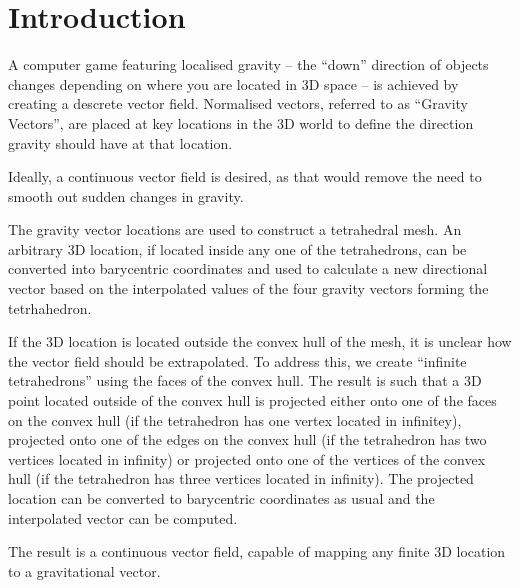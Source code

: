 \section{Introduction}

A computer game featuring localised gravity -- the ``down'' direction of objects
changes  depending on where you are located  in  3D  space  --  is  achieved  by
creating a descrete  vector  field. Normalised vectors, referred to as ``Gravity
Vectors'', are placed at key locations  in  the 3D world to define the direction
gravity should have at that location.

Ideally, a continuous vector field is desired,  as that would remove the need to
smooth out  sudden  changes in gravity.

The  gravity  vector locations are used to  construct  a  tetrahedral  mesh.  An
arbitrary 3D location, if located inside any  one  of  the  tetrahedrons, can be
converted into barycentric coordinates and used  to  calculate a new directional
vector based on the interpolated values of the four  gravity vectors forming the
tetrhahedron.

If the 3D location is located outside the convex hull of the mesh, it is unclear
how  the  vector  field should be  extrapolated.  To  address  this,  we  create
``infinite tetrahedrons'' using the faces of the convex hull. The result is such
that a 3D  point located outside of the convex hull is projected either onto one
of the faces on the convex  hull  (if  the tetrahedron has one vertex located in
infinitey),  projected  onto  one of the  edges  on  the  convex  hull  (if  the
tetrahedron has two vertices  located  in infinity) or projected onto one of the
vertices  of  the  convex hull (if the tetrahedron has three vertices located in
infinity). The projected location can be converted to barycentric coordinates as
usual and the interpolated vector can be computed.

The  result is a continuous vector field,  capable  of  mapping  any  finite  3D
location to a gravitational vector.
